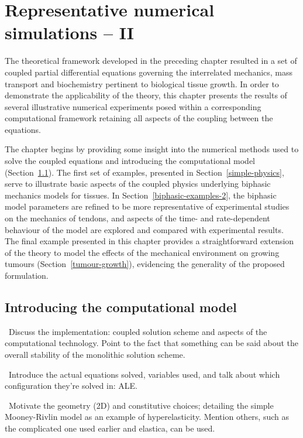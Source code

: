 \chapter{Representative numerical simulations -- II}
\label{numerical-simulations-2}

The theoretical framework developed in the preceding chapter resulted
in a set of coupled partial differential equations governing the
interrelated mechanics, mass transport and biochemistry pertinent to
biological tissue growth. In order to demonstrate the applicability of
the theory, this chapter presents the results of several illustrative
numerical experiments posed within a corresponding computational
framework retaining all aspects of the coupling between the equations.

The chapter begins by providing some insight into the numerical
methods used to solve the coupled equations and introducing the
computational model (Section~\ref{eu-computational-model}). The first
set of examples, presented in Section~\ref{simple-physics}, serve to
illustrate basic aspects of the coupled physics underlying biphasic
mechanics models for tissues. In Section~\ref{biphasic-examples-2},
the biphasic model parameters are refined to be more representative of
experimental studies on the mechanics of tendons, and aspects of the
time- and rate-dependent behaviour of the model are explored and
compared with experimental results. The final example presented in
this chapter provides a straightforward extension of the theory to
model the effects of the mechanical environment on growing tumours
(Section~\ref{tumour-growth}), evidencing the generality of the
proposed formulation.

\section{Introducing the computational model}
\label{eu-computational-model}

\textbullet\ Discuss the implementation: coupled solution scheme and
aspects of the computational technology. Point to the fact that
something can be said about the overall stability of the monolithic
solution scheme.

\textbullet\ Introduce the actual equations solved, variables used,
and talk about which configuration they're solved in: ALE.

\textbullet\ Motivate the geometry (2D) and constitutive choices;
detailing the simple Mooney-Rivlin model as an example of
hyperelasticity. Mention others, such as the complicated one used
earlier and elastica, can be used.

